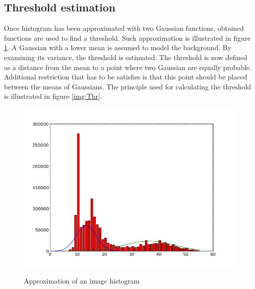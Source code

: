 
\subsection{Threshold estimation}

Once histogram has been approximated with two Gaussian functions, obtained functions are used to find a threshold. Such approximation is illustrated in figure \ref{img:Approx}. A Gaussian with a lower mean is assumed to model the background. By examining its variance, the threshold is estimated. The threshold is now defined as a distance from the mean to a point where two Gaussian are equally probable. Additional restriction that has to be satisfies is that this point should be placed between the means of Gaussians. The principle used for calculating the threshold is illustrated in figure \ref{img:Thr}. \\

\begin{figure}
	\begin{center}
		\includegraphics[scale=0.4]{Figures/segmentation/temp_hist_prez}
		\label{img:Approx}
		\caption{Approximation of an image histogram}
	\end{center}
\end{figure}

